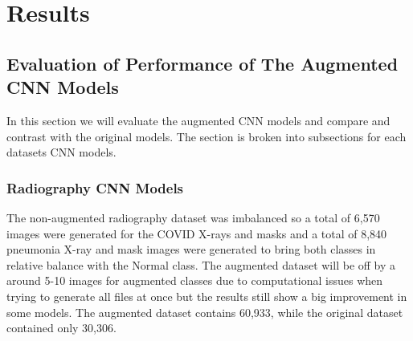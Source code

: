 \chapter{Results}
\section{Evaluation of Performance of The Augmented CNN Models}
In this section we will evaluate the augmented CNN models and compare and contrast with the original models.  The section is broken into subsections for each datasets CNN models.
\subsection{Radiography CNN Models}
  The non-augmented radiography dataset was imbalanced so a total of 6,570 images were generated for the COVID X-rays and masks and a total of 8,840 pneumonia X-ray and mask images were generated to bring both classes in relative balance with the Normal class.  The augmented dataset will be off by a around 5-10 images for augmented classes due to computational issues when trying to generate all files at once but the results still show a big improvement in some models.  The augmented dataset contains 60,933, while the original dataset contained only 30,306. 
